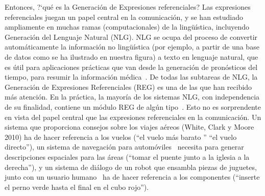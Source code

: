 Entonces,  ?`qu\'e es la Generaci\'on de Expresiones referenciales? Las expresiones referenciales juegan un papel central
en la comunicaci\'on, y se han estudiado ampliamente en muchas ramas (computacionales) de la ling\"u\'{i}stica,
 incluyendo Generaci\'on del Lenguaje Natural (NLG). NLG se ocupa del proceso de convertir autom\'aticamente la informaci\'on no ling\"u\'{i}stica (por ejemplo, a partir de una base de datos como se ha ilustrado en nuestra figura) a texto en lenguaje natural, que es \'util para aplicaciones pr\'acticas que van desde la generaci\'on de pron\'osticos del tiempo, para resumir la informaci\'on m\'edica~\cite{dale2000}. De todas las subtareas de NLG, la Generaci\'on de Expresiones Referenciales (REG) es
una de las que han recibido m\'as atenci\'on. En la pr\'actica, la mayor\'ia de los
sistemas NLG, con independencia de su finalidad,
contiene un m\'odulo REG de alg\'un tipo~\cite{Mellish2004}. Esto no es sorprendente
en vista del papel central que las expresiones referenciales en la comunicaci\'on. Un sistema que proporciona
consejos sobre los viajes a\'ereos (White, Clark y Moore 2010) ha de hacer referencia a los vuelos (``el
vuelo m\'as barato '' ``el vuelo directo''), un sistema de navegaci\'on para autom\'oviles~\cite{Drager:2012:GLN:2380816.2380908}
necesita para generar descripciones espaciales para las \'areas (``tomar el puente junto a la iglesia a la derecha''),
y un sistema de di\'alogo de un robot que ensambla piezas de juguetes, junto con un usuario humano~\cite{foster-etal-ijcai2009} ha de hacer referencia a los componentes (``inserte el perno verde hasta el final en el cubo rojo'').



